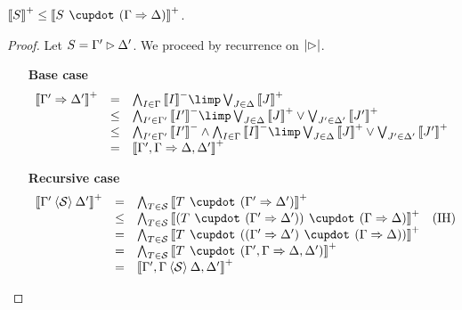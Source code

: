 
\begin{lemma}[Weakening]
  $\psint{S} \sement \psint{S \mix (\Gamma \seq \Delta)}$.
\end{lemma}
\begin{proof}
  Let $S = \Gamma' \mathbin{\rhd} \Delta'$. We proceed by recurrence on $\left|\mathbin{\rhd}\right|$.
  \begin{itemize}
    \item[\textbf{Base case}]
    $$
    \begin{array}{rcll}
      \psint{\Gamma' \seq \Delta'}
      &=& \bigwedge_{I \in \Gamma}{\nsint{I}} \limp \bigvee_{J \in \Delta}{\psint{J}} & \\
      &\sement& \bigwedge_{I' \in \Gamma'}{\nsint{I'}} \limp \bigvee_{J \in \Delta}{\psint{J} \vee \bigvee_{J' \in \Delta'}{\psint{J'}}} & \\
      &\sement& \bigwedge_{I' \in \Gamma'}{\nsint{I'}} \wedge \bigwedge_{I \in \Gamma}{\nsint{I}} \limp \bigvee_{J \in \Delta}{\psint{J} \vee \bigvee_{J' \in \Delta'}{\psint{J'}}} & \\
      &=& \psint{\Gamma', \Gamma \seq \Delta, \Delta'} & \\
    \end{array}
    $$
    \item[\textbf{Recursive case}]
    $$
    \begin{array}{rcll}
      \psint{\Gamma' \piq{\mathcal{S}} \Delta'}
      &=& \bigwedge_{T \in \mathcal{S}}{\psint{T \mix (\Gamma' \seq \Delta')}} & \\
      &\sement& \bigwedge_{T \in \mathcal{S}}{\psint{(T \mix (\Gamma' \seq \Delta')) \mix (\Gamma \seq \Delta)}} &\text{(IH)} \\
      &=& \bigwedge_{T \in \mathcal{S}}{\psint{T \mix ((\Gamma' \seq \Delta') \mix (\Gamma \seq \Delta))}} & \\
      &=& \bigwedge_{T \in \mathcal{S}}{\psint{T \mix (\Gamma', \Gamma \seq \Delta, \Delta')}} & \\
      &=& \psint{\Gamma', \Gamma \piq{\mathcal{S}} \Delta, \Delta'} & \\
    \end{array}
    $$
  \end{itemize}
\end{proof}

